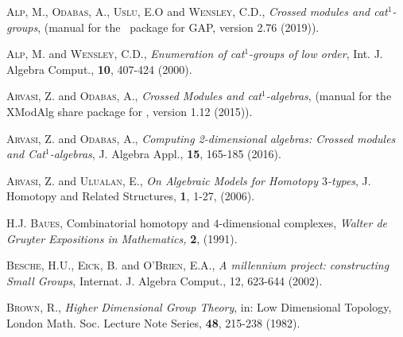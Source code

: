 \documentclass[a4paper,11pt]{article}
\theoremstyle{plain}
\theoremstyle{definition}
\begin{document}
\begin{thebibliography}{99}

	 \textsc{Alp, M.}, \textsc{Odabas, A.}, 
	               \textsc{Uslu, E.O} and \textsc{Wensley, C.D.},   
	\emph{Crossed modules and cat$^{1}$-groups}, 
	{(manual for the \XMod\ package for \textsf{GAP}, version 2.76 (2019))}. 
	
	 \textsc{Alp, M.} and \textsc{Wensley, C.D.}, 
	\emph{Enumeration of cat$^{1}$-groups of low order}, 
	Int. J. Algebra Comput., \textbf{10}, 407-424 (2000).
	
	
	 \textsc{Arvasi, Z.} and \textsc{Odabas, A.},  
	\emph{Crossed Modules and cat$^1$-algebras}, 
	{(manual for the \textsf{XModAlg} share package for \GAP, version 1.12  
	(2015)).} 
	
	 \textsc{Arvasi, Z.} and \textsc{Odabas, A.}, 
	\emph{Computing 2-dimensional algebras: Crossed modules and Cat$^1$-algebras}, 
	J. Algebra Appl., \textbf{15}, 165-185 (2016).
	
	 \textsc{Arvasi, Z.} and \textsc{Ulualan, E.}, 
	\emph{On Algebraic Models for Homotopy $3$-types}, 
	J. Homotopy and Related Structures, \textbf{1}, 1-27, (2006).
		
	
	 \textsc{H.J. Baues}, 
	\textrm{Combinatorial homotopy and $4$-dimensional complexes,} 
	\emph{Walter de Gruyter Expositions in Mathematics,} \textbf{2}, (1991).
	
	
	\textsc{Besche, H.U.}, \textsc{Eick, B.} and \textsc{O'Brien, E.A.}, 
	\emph{A millennium project: constructing Small Groups}, 
	Internat. J. Algebra Comput., 12, 623-644 (2002).
	
	 \textsc{Brown, R.}, 
	\emph{Higher Dimensional Group Theory}, 
	in: Low Dimensional Topology, 
	London Math. Soc. Lecture Note Series, \textbf{48}, 215-238 (1982).
	

\end{thebibliography}
\end{document}
